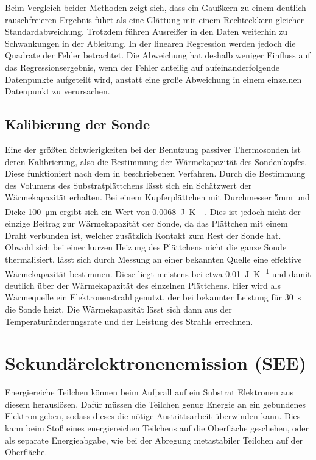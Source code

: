 Beim Vergleich beider Methoden zeigt sich, dass ein Gaußkern zu einem deutlich rauschfreieren Ergebnis führt als eine Glättung mit einem Rechteckkern gleicher Standardabweichung. Trotzdem führen Ausreißer in den Daten weiterhin zu Schwankungen in der Ableitung. In der linearen Regression werden jedoch die Quadrate der Fehler betrachtet. Die Abweichung hat deshalb weniger Einfluss auf das Regressionsergebnis, wenn der Fehler anteilig auf aufeinanderfolgende Datenpunkte aufgeteilt wird, anstatt eine große Abweichung in einem einzelnen Datenpunkt zu verursachen.

\subsection{Kalibierung der Sonde}

Eine der größten Schwierigkeiten bei der Benutzung passiver Thermosonden ist deren Kalibrierung, also die Bestimmung der Wärmekapazität des Sondenkopfes. Diese funktioniert nach dem in \cite{stahlCalorimetricProbePlasma2010a} beschriebenen Verfahren. Durch die Bestimmung des Volumens des Substratplättchens lässt sich ein Schätzwert der Wärmekapazität erhalten. Bei einem Kupferplättchen mit Durchmesser 5mm und Dicke \qty{100}{\um} ergibt sich ein Wert von \qty{0,0068}{\joule\per\kelvin}. Dies ist jedoch nicht der einzige Beitrag zur Wärmekapazität der Sonde, da das Plättchen mit einem Draht verbunden ist, welcher zusätzlich Kontakt zum Rest der Sonde hat. Obwohl sich bei einer kurzen Heizung des Plättchens nicht die ganze Sonde thermalisiert, lässt sich durch Messung an einer bekannten Quelle eine effektive Wärmekapazität bestimmen. Diese liegt meistens bei etwa \qty{0,01}{\joule\per\kelvin} und damit deutlich über der Wärmekapazität des einzelnen Plättchens. Hier wird als Wärmequelle ein Elektronenstrahl genutzt, der bei bekannter Leistung für \qty{30}{\second} die Sonde heizt. Die Wärmekapazität lässt sich dann aus der Temperaturänderungsrate und der Leistung des Strahls errechnen.

\section{Sekundärelektronenemission (SEE)}
Energiereiche Teilchen können beim Aufprall auf ein Substrat Elektronen aus diesem herauslösen. Dafür müssen die Teilchen genug Energie an ein gebundenes Elektron geben, sodass dieses die nötige Austrittsarbeit überwinden kann. Dies kann beim Stoß eines energiereichen Teilchens auf die Oberfläche geschehen, oder als separate Energieabgabe, wie bei der Abregung metastabiler Teilchen auf der Oberfläche.
